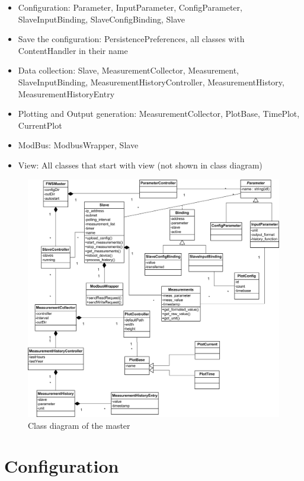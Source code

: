 \begin{itemize}
    \item Configuration: Parameter, InputParameter, ConfigParameter, SlaveInputBinding, SlaveConfigBinding, Slave
    \item Save the configuration: PersistencePreferences, all classes with ContentHandler in their name
    \item Data collection: Slave, MeasurementCollector, Measurement, SlaveInputBinding, MeasurementHistoryController, MeasurementHistory, MeasurementHistoryEntry
    \item Plotting and Output generation: MeasurementCollector, PlotBase, TimePlot, CurrentPlot
    \item ModBus: ModbusWrapper, Slave
    \item View: All classes that start with view (not shown in class diagram)
\end{itemize}

\begin{figure}[ht]
    \centering
    \includegraphics[width=\linewidth]{master/class.png}
    \caption{Class diagram of the master}
    \label{fig:class_master}
\end{figure}


\section{Configuration} %
\label{sec:configuration} 


